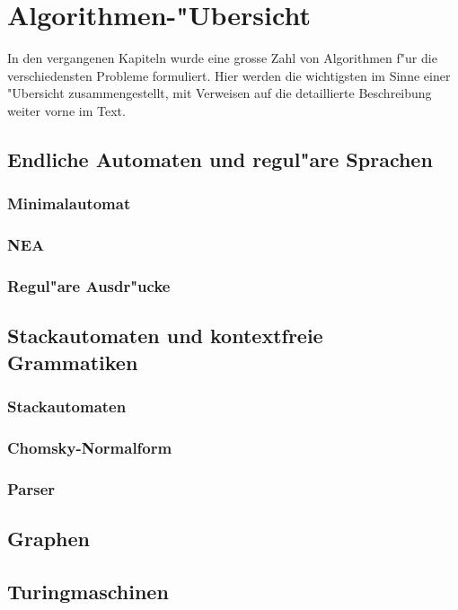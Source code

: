 \chapter{Algorithmen-"Ubersicht\label{skript:algorithmen}}
\rhead{}
In den vergangenen Kapiteln wurde eine grosse Zahl von Algorithmen
f"ur die verschiedensten Probleme formuliert. Hier werden die wichtigsten
im Sinne einer "Ubersicht zusammengestellt, mit Verweisen auf die 
detaillierte Beschreibung weiter vorne im Text.
\section{Endliche Automaten und regul"are Sprachen}
\subsection{Minimalautomat}
\subsection{NEA}
\subsection{Regul"are Ausdr"ucke}
\section{Stackautomaten und kontextfreie Grammatiken}
\subsection{Stackautomaten}
\subsection{Chomsky-Normalform}
\subsection{Parser}
\section{Graphen}
\section{Turingmaschinen}

